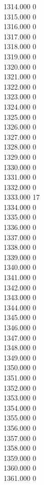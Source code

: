 { 1314.000	0 \\
 1315.000	0 \\
 1316.000	0 \\
 1317.000	0 \\
 1318.000	0 \\
 1319.000	0 \\
 1320.000	0 \\
 1321.000	0 \\
 1322.000	0 \\
 1323.000	0 \\
 1324.000	0 \\
 1325.000	0 \\
 1326.000	0 \\
 1327.000	0 \\
 1328.000	0 \\
 1329.000	0 \\
 1330.000	0 \\
 1331.000	0 \\
 1332.000	0 \\
 1333.000	17 \\
 1334.000	0 \\
 1335.000	0 \\
 1336.000	0 \\
 1337.000	0 \\
 1338.000	0 \\
 1339.000	0 \\
 1340.000	0 \\
 1341.000	0 \\
 1342.000	0 \\
 1343.000	0 \\
 1344.000	0 \\
 1345.000	0 \\
 1346.000	0 \\
 1347.000	0 \\
 1348.000	0 \\
 1349.000	0 \\
 1350.000	0 \\
 1351.000	0 \\
 1352.000	0 \\
 1353.000	0 \\
 1354.000	0 \\
 1355.000	0 \\
 1356.000	0 \\
 1357.000	0 \\
 1358.000	0 \\
 1359.000	0 \\
 1360.000	0 \\
 1361.000	0 \\
}
